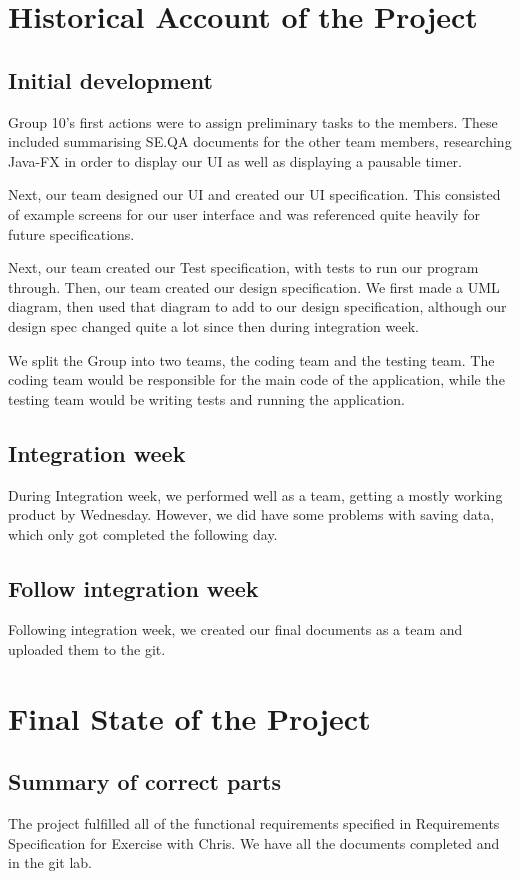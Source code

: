 \documentclass[10pt,a4paper]{article}
\begin{document}
	\section{Historical Account of the Project}
	\subsection{Initial development}
	Group 10's first actions were to assign preliminary tasks to the members. These included summarising SE.QA documents for the other team members, researching Java-FX in order to display our UI as well as displaying a pausable timer.
	\par
	Next, our team designed our UI and created our UI specification. This consisted of example screens for our user interface and was referenced quite heavily for future specifications.
	\par
	Next, our team created our Test specification, with tests to run our program through. Then, our team created our design specification. We first made a UML diagram, then used that diagram to add to our design specification, although our design spec changed quite a lot since then during integration week.
	\par
	We split the Group into two teams, the coding team and the testing team. The coding team would be responsible for the main code of the application, while the testing team would be writing tests and running the application.
	\subsection{Integration week}
	During Integration week, we performed well as a team, getting a mostly working product by Wednesday. However, we did have some problems with saving data, which only got completed the following day.
	\subsection{Follow integration week}
	Following integration week, we created our final documents as a team and uploaded them to the git. 
	\newpage
	\section{Final State of the Project}
	\subsection{Summary of correct parts}
	The project fulfilled all of the functional requirements specified in Requirements Specification for Exercise with Chris.\cite{requirementsSpecification} We have all the documents completed and in the git lab.
\end{document}
